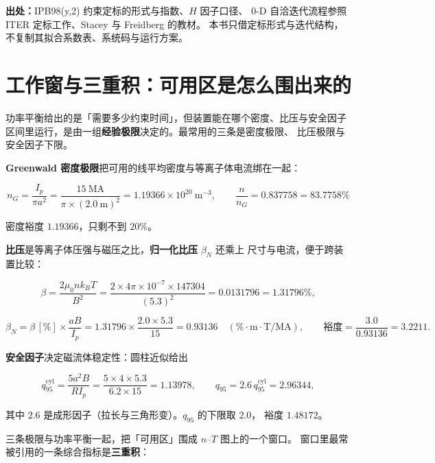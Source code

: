 {\footnotesize
\textbf{出处：}IPB98(y,2) 约束定标的形式与指数、$H$ 因子口径、
0-D 自洽迭代流程参照 ITER 定标工作、Stacey 与 Freidberg 的教材。
本书只借定标形式与迭代结构，不复制其拟合系数表、系统码与运行方案。
\section{工作窗与三重积：可用区是怎么围出来的}
\label{sec:app-az-window}
}

功率平衡给出的是「需要多少约束时间」，但装置能在哪个密度、比压与安全因子
区间里运行，是由一组\textbf{经验极限}决定的。最常用的三条是密度极限、
比压极限与安全因子下限。

\textbf{Greenwald 密度极限}把可用的线平均密度与等离子体电流绑在一起：

\begin{equation}
n_G=\frac{I_p}{\pi a^2}
=\frac{15\ \mathrm{MA}}{\pi\times(2.0\ \mathrm{m})^2}
=1.19366\times10^{20}\ \mathrm{m^{-3}},
\qquad
\frac{n}{n_G}=0.837758=83.7758\%
\label{eq:app-az-greenwald}
\end{equation}

密度裕度 $1.19366$，只剩不到 $20\%$。

\textbf{比压}是等离子体压强与磁压之比，\textbf{归一化比压} $\beta_N$ 还乘上
尺寸与电流，便于跨装置比较：

\begin{equation}
\beta=\frac{2\mu_0 nk_BT}{B^2}
=\frac{2\times4\pi\times10^{-7}\times147304}{(5.3)^2}
=0.0131796=1.31796\%,
\label{eq:app-az-beta}
\end{equation}

\begin{equation}
\beta_N=\beta\,[\%]\times\frac{a B}{I_p}
=1.31796\times\frac{2.0\times5.3}{15}=0.93136
\quad(\%\cdot\mathrm{m}\cdot\mathrm{T/MA}),
\qquad
\text{裕度}=\frac{3.0}{0.93136}=3.2211.
\label{eq:app-az-betan}
\end{equation}

\textbf{安全因子}决定磁流体稳定性：圆柱近似给出

\begin{equation}
q_{95}^\mathrm{cyl}=\frac{5a^2B}{RI_p}
=\frac{5\times4\times5.3}{6.2\times15}=1.13978,
\qquad
q_{95}=2.6\,q_{95}^\mathrm{cyl}=2.96344,
\label{eq:app-az-q95}
\end{equation}

其中 $2.6$ 是成形因子（拉长与三角形变）。$q_{95}$ 的下限取 $2.0$，
裕度 $1.48172$。

三条极限与功率平衡一起，把「可用区」围成 $n$--$T$ 图上的一个窗口。
窗口里最常被引用的一条综合指标是\textbf{三重积}：

